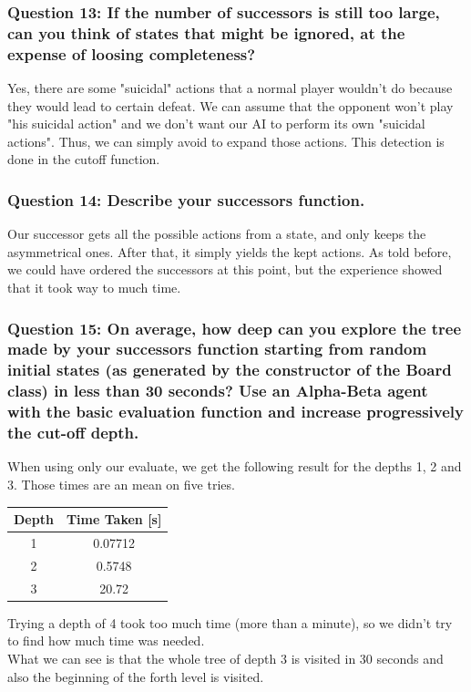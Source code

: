 \documentclass[a4paper,10pt]{article}
\begin{document}
				\subsubsection{Question 13: If the number of successors is still too large, can you think of states that might be ignored, at the expense of loosing completeness?}
					Yes, there are some "suicidal" actions that a normal player wouldn't do because they would lead to certain defeat. We can assume that the opponent won't play "his suicidal action" and we don't want our AI to perform its own "suicidal actions". Thus, we can simply avoid to expand those actions. This detection is done in the cutoff function.
				\subsubsection{Question 14: Describe your successors function.}
					Our successor gets all the possible actions from a state, and only keeps the asymmetrical ones. After that, it simply yields the kept actions. As told before, we could have ordered the successors at this point, but the experience showed that it took way to much time.
				\subsubsection{Question 15: On average, how deep can you explore the tree made by your successors function starting from random initial states (as generated by the constructor of the Board class) in less than 30 seconds? Use an Alpha-Beta agent with the basic evaluation function and increase progressively the cut-off depth.}
					When using only our evaluate, we get the following result for the depths 1, 2 and 3. Those times are an mean on five tries.
					\begin{center}
						\begin{tabular}{|c|c|}
						\hline 
						Depth & Time Taken [s] \\ 
						\hline 
						1 & 0.07712 \\ 
						\hline 
						2 & 0.5748 \\ 
						\hline 
						3 & 20.72 \\ 
						\hline 
						\end{tabular} 
					\end{center}
					Trying a depth of 4 took too much time (more than a minute), so we didn't try to find how much time was needed.\\
					What we can see is that the whole tree of depth 3 is visited in 30 seconds and also the beginning of the forth level is visited.
				
\end{document}
